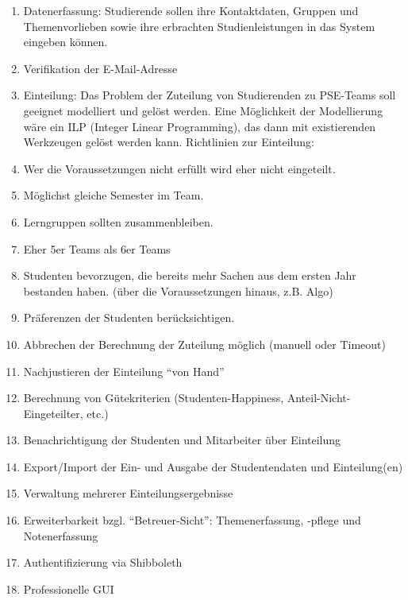 \documentclass[parskip=full]{scrartcl}
\begin{document}
\begin{enumerate}[{Z}1]
    \item Datenerfassung: Studierende sollen ihre Kontaktdaten, Gruppen und
    Themenvorlieben sowie ihre erbrachten Studienleistungen in das System eingeben können.

    \item Verifikation der E-Mail-Adresse

    \item Einteilung: Das Problem der Zuteilung von Studierenden zu PSE-Teams
    soll geeignet modelliert und gelöst werden. Eine Möglichkeit der Modellierung wäre ein ILP (Integer Linear Programming), das dann mit existierenden Werkzeugen gelöst werden kann. Richtlinien zur Einteilung:

        \item Wer die Voraussetzungen nicht erfüllt wird eher nicht eingeteilt.

        \item Möglichst gleiche Semester im Team.

        \item Lerngruppen sollten zusammenbleiben.

        \item Eher 5er Teams als 6er Teams

        \item Studenten bevorzugen, die bereits mehr Sachen aus dem ersten Jahr
        bestanden haben. (über die Voraussetzungen hinaus, z.B. Algo)

        \item Präferenzen der Studenten berücksichtigen.

    \item Abbrechen der Berechnung der Zuteilung möglich (manuell oder Timeout)

    \item Nachjustieren der Einteilung “von Hand”

    \item Berechnung von Gütekriterien (Studenten-Happiness,
    Anteil-Nicht-Eingeteilter, etc.)

    \item Benachrichtigung der Studenten und Mitarbeiter über Einteilung

    \item Export/Import der Ein- und Ausgabe der Studentendaten und
    Einteilung(en)

    \item Verwaltung mehrerer Einteilungsergebnisse

    \item Erweiterbarkeit bzgl. “Betreuer-Sicht”: Themenerfassung, -pflege und
    Notenerfassung

    \item Authentifizierung via Shibboleth

    \item Professionelle GUI
\end{enumerate}
\end{document}
